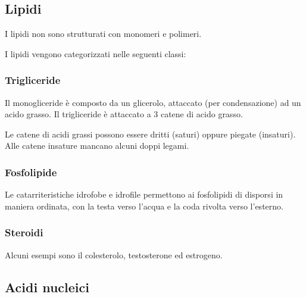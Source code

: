 \documentclass[a4paper]{article}
\begin{document}
\pagebreak

\subsection{Lipidi}


I lipidi non sono strutturati con monomeri e polimeri.

I lipidi vengono categorizzati nelle seguenti classi:

\subsubsection{Trigliceride}


Il monogliceride è composto da un glicerolo, attaccato (per condensazione) ad un acido grasso.
Il trigliceride è attaccato a 3 catene di acido grasso.

Le catene di acidi grassi possono essere dritti (saturi) oppure piegate (insaturi).
Alle catene insature mancano alcuni doppi legami.

\subsubsection{Fosfolipide}


Le catarriteristiche idrofobe e idrofile permettono ai fosfolipidi di disporsi in maniera ordinata,
con la testa verso l'acqua e la coda rivolta verso l'esterno.

\subsubsection{Steroidi}


Alcuni esempi sono il colesterolo, testosterone ed estrogeno.

\pagebreak

\subsection{Acidi nucleici}
\end{document}
